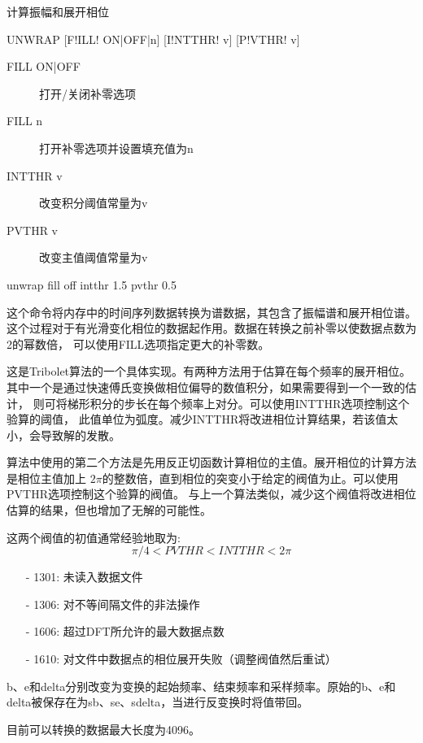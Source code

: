 \label{cmd:unwrap}

计算振幅和展开相位

\begin{SACSTX}
UNWRAP [F!ILL! ON|OFF|n] [I!NTTHR! v] [P!VTHR! v]
\end{SACSTX}

\begin{description}
\item [FILL ON|OFF] 打开/关闭补零选项 
\item [FILL n] 打开补零选项并设置填充值为n 
\item [INTTHR v] 改变积分阈值常量为v 
\item [PVTHR v] 改变主值阈值常量为v 
\end{description}

\begin{SACDFT}
unwrap fill off intthr 1.5 pvthr 0.5
\end{SACDFT}

这个命令将内存中的时间序列数据转换为谱数据，其包含了振幅谱和展开相位谱。
这个过程对于有光滑变化相位的数据起作用。数据在转换之前补零以使数据点数为2的幂数倍，
可以使用FILL选项指定更大的补零数。

这是Tribolet算法的一个具体实现。有两种方法用于估算在每个频率的展开相位。
其中一个是通过快速傅氏变换做相位偏导的数值积分，如果需要得到一个一致的估计，
则可将梯形积分的步长在每个频率上对分。可以使用INTTHR选项控制这个验算的阈值，
此值单位为弧度。减少INTTHR将改进相位计算结果，若该值太小，会导致解的发散。

算法中使用的第二个方法是先用反正切函数计算相位的主值。展开相位的计算方法是相位主值加上
$2\pi$的整数倍，直到相位的突变小于给定的阀值为止。可以使用PVTHR选项控制这个验算的阀值。
与上一个算法类似，减少这个阀值将改进相位估算的结果，但也增加了无解的可能性。

这两个阀值的初值通常经验地取为:
\[ \pi/4 < PVTHR < INTTHR < 2\pi \]

\begin{itemize}
\item[-]1301: 未读入数据文件
\item[-]1306: 对不等间隔文件的非法操作
\item[-]1606: 超过DFT所允许的最大数据点数
\end{itemize}

\begin{itemize}
\item[-]1610: 对文件中数据点的相位展开失败（调整阀值然后重试）
\end{itemize}

b、e和delta分别改变为变换的起始频率、结束频率和采样频率。原始的b、e和delta被保存在为sb、se、sdelta，当进行反变换时将值带回。

目前可以转换的数据最大长度为4096。
